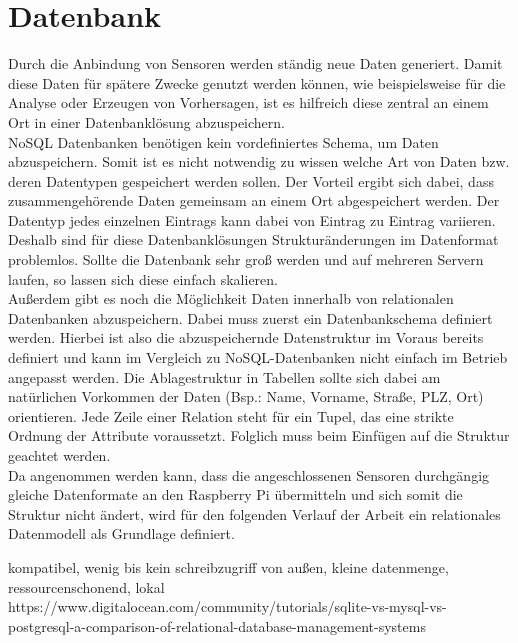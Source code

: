 \section{Datenbank}
Durch die Anbindung von Sensoren werden ständig neue Daten generiert. Damit diese Daten für spätere Zwecke genutzt werden können, wie beispielsweise für die Analyse oder Erzeugen von Vorhersagen, ist es hilfreich diese zentral an einem Ort in einer Datenbanklösung abzuspeichern.
\\NoSQL Datenbanken benötigen kein vordefiniertes Schema, um Daten abzuspeichern. Somit ist es nicht notwendig zu wissen welche Art von Daten bzw. deren Datentypen gespeichert werden sollen. Der Vorteil ergibt sich dabei, dass zusammengehörende Daten gemeinsam an einem Ort abgespeichert werden. Der Datentyp jedes einzelnen Eintrags kann dabei von Eintrag zu Eintrag variieren. Deshalb sind für diese Datenbanklösungen Strukturänderungen im Datenformat problemlos. Sollte die Datenbank sehr groß werden und auf mehreren Servern laufen, so lassen sich diese einfach skalieren\cite{noSQL:noSQL}.
\\Außerdem gibt es noch die Möglichkeit Daten innerhalb von relationalen Datenbanken abzuspeichern. Dabei muss zuerst ein Datenbankschema definiert werden. Hierbei ist also die abzuspeichernde Datenstruktur im Voraus bereits definiert und kann im Vergleich zu NoSQL-Datenbanken nicht einfach im Betrieb angepasst werden. Die Ablagestruktur in Tabellen sollte sich dabei am natürlichen Vorkommen der Daten (Bsp.: Name, Vorname, Straße, PLZ, Ort)  orientieren. Jede Zeile einer Relation steht für ein Tupel, das eine strikte Ordnung der Attribute voraussetzt\cite{codd:Codd}. Folglich muss beim Einfügen auf die Struktur geachtet werden.
\\Da angenommen werden kann, dass die angeschlossenen Sensoren durchgängig gleiche Datenformate an den Raspberry Pi übermitteln und sich somit die Struktur nicht ändert, wird für den folgenden Verlauf der Arbeit ein relationales Datenmodell als Grundlage definiert.




kompatibel, wenig bis kein schreibzugriff von außen, kleine datenmenge, ressourcenschonend, lokal
https://www.digitalocean.com/community/tutorials/sqlite-vs-mysql-vs-postgresql-a-comparison-of-relational-database-management-systems
